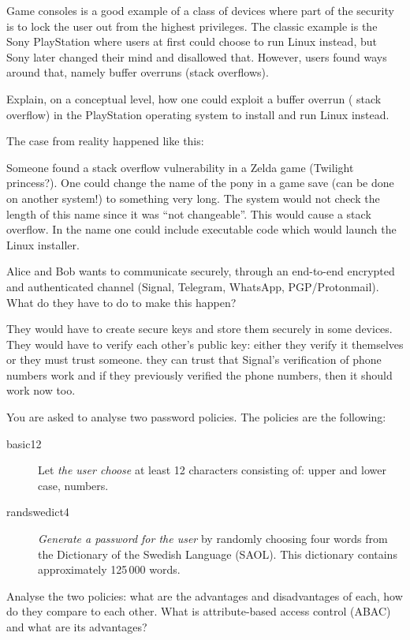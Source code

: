 \question[3]\label{q:software}
Game consoles is a good example of a class of devices where part of the 
security is to lock the user out from the highest privileges.
The classic example is the Sony PlayStation where users at first could choose 
to run Linux instead, but Sony later changed their mind and disallowed that.
However, users found ways around that, namely buffer overruns (\eg stack 
overflows).

Explain, on a conceptual level, how one could exploit a buffer overrun (\eg 
stack overflow) in the PlayStation operating system to install and run Linux 
instead.

\begin{solution}
  The case from reality happened like this:

  Someone found a stack overflow vulnerability in a Zelda game (Twilight 
  princess?).
  One could change the name of the pony in a game save (can be done on another 
  system!) to something very long.
  The system would not check the length of this name since it was \enquote{not 
  changeable}.
  This would cause a stack overflow.
  In the name one could include executable code which would launch the Linux 
  installer.
\end{solution}


\question[3]
  Alice and Bob wants to communicate securely, \ie through an end-to-end 
  encrypted and authenticated channel (\eg Signal, Telegram, WhatsApp, 
  PGP/Protonmail).
  What do they have to do to make this happen?

  \begin{solution}
    They would have to create secure keys and store them securely in some 
    devices.
    They would have to verify each other's public key: either they verify it 
    themselves or they must trust someone.
    \Eg they can trust that Signal's verification of phone numbers work and if 
    they previously verified the phone numbers, then it should work now too.
  \end{solution}


  
\question[3]
  You are asked to analyse two password policies.
  The policies are the following:
  \begin{description}
    \item[basic12]
      Let \emph{the user choose} at least 12 characters consisting of: upper 
      and lower case, numbers.
    \item[randswedict4]
      \emph{Generate a password for the user} by randomly choosing four words 
      from the Dictionary of the Swedish Language (SAOL).
      This dictionary contains approximately 125\,000 words.
  \end{description}
  Analyse the two policies: what are the advantages and disadvantages of each, 
  how do they compare to each other.
\question[3]
What is attribute-based access control (ABAC) and what are its advantages?

